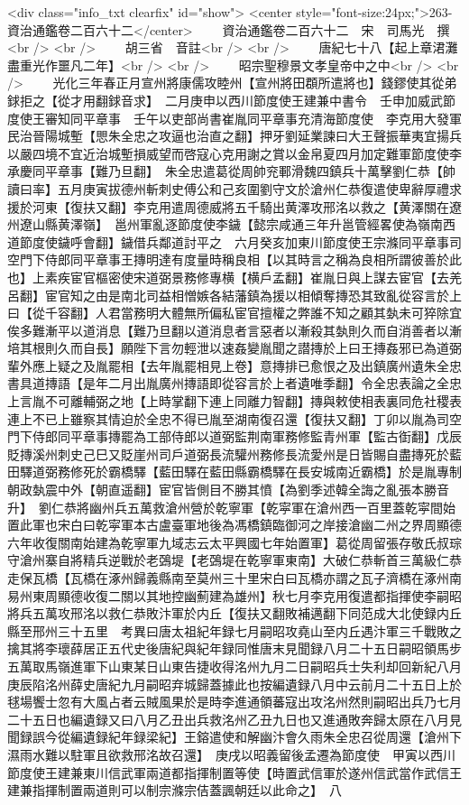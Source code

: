 <div class="info_txt clearfix" id="show">
<center style="font-size:24px;">263-資治通鑑卷二百六十二</center>
  　　資治通鑑卷二百六十二　宋　司馬光　撰<br />
<br />
　　胡三省　音註<br />
<br />
　　唐紀七十八【起上章涒灘盡重光作噩凡二年】<br />
<br />
　　昭宗聖穆景文孝皇帝中之中<br />
<br />
　　光化三年春正月宣州將康儒攻睦州【宣州將田頵所遣將也】錢鏐使其從弟銶拒之【從才用翻銶音求】　二月庚申以西川節度使王建兼中書令　壬申加威武節度使王審知同平章事　壬午以吏部尚書崔胤同平章事充清海節度使　李克用大發軍民治晉陽城塹【愳朱全忠之攻逼也治直之翻】押牙劉延業諫曰大王聲振華夷宜揚兵以嚴四境不宜近治城塹損威望而啓寇心克用謝之賞以金帛夏四月加定難軍節度使李承慶同平章事【難乃旦翻】　朱全忠遣葛從周帥兖鄆滑魏四鎮兵十萬擊劉仁恭【帥讀曰率】五月庚寅拔德州斬刺史傅公和己亥圍劉守文於滄州仁恭復遣使卑辭厚禮求援於河東【復扶又翻】李克用遣周德威將五千騎出黄澤攻邢洺以救之【黄澤關在遼州遼山縣黄澤嶺】　邕州軍亂逐節度使李鐬【懿宗咸通三年升邕管經畧使為嶺南西道節度使鐬呼會翻】鐬借兵鄰道討平之　六月癸亥加東川節度使王宗滌同平章事司空門下侍郎同平章事王摶明達有度量時稱良相【以其時言之稱為良相所謂彼善於此也】上素疾宦官樞密使宋道弼景務修專横【横戶孟翻】崔胤日與上謀去宦官【去羌呂翻】宦官知之由是南北司益相憎嫉各結藩鎮為援以相傾奪摶恐其致亂從容言於上曰【從千容翻】人君當務明大體無所偏私宦官擅權之弊誰不知之顧其埶未可猝除宜俟多難漸平以道消息【難乃旦翻以道消息者言惡者以漸殺其埶則久而自消善者以漸培其根則久而自長】願陛下言勿輕泄以速姦變胤聞之譛摶於上曰王摶姦邪已為道弼輩外應上疑之及胤罷相【去年胤罷相見上卷】意摶排已愈恨之及出鎮廣州遺朱全忠書具道摶語【是年二月出胤廣州摶語即從容言於上者遺唯季翻】令全忠表論之全忠上言胤不可離輔弼之地【上時掌翻下連上同離力智翻】摶與敕使相表裏同危社稷表連上不已上雖察其情迫於全忠不得已胤至湖南復召還【復扶又翻】丁卯以胤為司空門下侍郎同平章事摶罷為工部侍郎以道弼監荆南軍務修監青州軍【監古衘翻】戊辰貶摶溪州刺史己巳又貶崖州司戶道弼長流驩州務修長流愛州是日皆賜自盡摶死於藍田驛道弼務修死於霸橋驛【藍田驛在藍田縣霸橋驛在長安城南近霸橋】於是胤專制朝政埶震中外【朝直遥翻】宦官皆側目不勝其憤【為劉季述韓全誨之亂張本勝音升】　劉仁恭將幽州兵五萬救滄州營於乾寧軍【乾寜軍在滄州西一百里蓋乾寜間始置此軍也宋白曰乾寜軍本古盧臺軍地後為馮橋鎮臨御河之岸接滄幽二州之界周顯德六年收復關南始建為乾寧軍九域志云太平興國七年始置軍】葛從周留張存敬氏叔琮守滄州寨自將精兵逆戰於老鵶堤【老鵶堤在乾寧軍東南】大破仁恭斬首三萬級仁恭走保瓦橋【瓦橋在涿州歸義縣南至莫州三十里宋白曰瓦橋亦謂之瓦子濟橋在涿州南易州東周顯德收復二關以其地控幽薊建為雄州】秋七月李克用復遣都指揮使李嗣昭將兵五萬攻邢洺以救仁恭敗汴軍於内丘【復扶又翻敗補邁翻下同范成大北使録内丘縣至邢州三十五里　考異曰唐太祖紀年録七月嗣昭攻堯山至内丘遇汴軍三千戰敗之擒其將李瓌薛居正五代史後唐紀與紀年録同惟唐末見聞録八月二十五日嗣昭領馬步五萬取馬嶺進軍下山東某日山東告捷收得洺州九月二日嗣昭兵士失利却回新紀八月庚辰陷洺州薛史唐紀九月嗣昭弃城歸蓋據此也按編遺録八月中云前月二十五日上於毬場饗士忽有大風占者云賊風果於是時李進通領蕃寇出攻洺州然則嗣昭出兵乃七月二十五日也編遺録又曰八月乙丑出兵救洺州乙丑九日也又進通敗奔歸太原在八月見聞録誤今從編遺録紀年録梁紀】王鎔遣使和解幽汴會久雨朱全忠召從周還【滄州下濕雨水難以駐軍且欲救邢洺故召還】　庚戌以昭義留後孟遷為節度使　甲寅以西川節度使王建兼東川信武軍兩道都指揮制置等使【時置武信軍於遂州信武當作武信王建兼指揮制置兩道則可以制宗滌宗佶蓋諷朝廷以此命之】　八